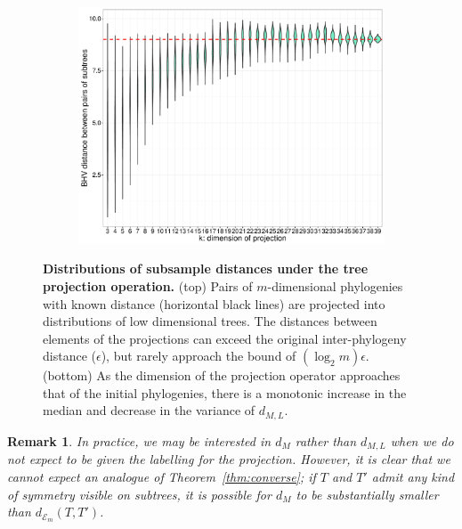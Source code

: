 \documentclass[a4paper,11pt]{article}
\newtheorem{remark}[theorem]{Remark}
\newcommand{\aE}{\mathcal{E}}
\begin{document}
\begin{figure}
    \begin{subfigure}{\linewidth}
    \centering
    \includegraphics[width=0.8\linewidth]{../figures/dimred_pwdist_m40_vs_K.pdf}
    \end{subfigure}

    \caption{{\bf Distributions of subsample distances under the tree projection operation.} (top) Pairs of $m$-dimensional phylogenies with known distance (horizontal black lines) are projected into distributions of low dimensional trees. The distances between elements of the projections can exceed the original inter-phylogeny distance ($\epsilon$), but rarely approach the bound of $(\log_2 m)\epsilon$. (bottom) As the dimension of the projection operator approaches that of the initial phylogenies, there is a monotonic increase in the median and decrease in the variance of $d_{M,L}$.}
    \label{fig:dimred_calibration}
\end{figure}

\begin{remark}
In practice, we may be interested in $d_M$ rather than $d_{M,L}$ when we do not expect to be given the labelling for the projection.
However, it is clear that we cannot expect an analogue of
Theorem~\ref{thm:converse}; if $T$ and $T'$ admit any kind of symmetry
visible on subtrees, it is possible for $d_M$ to be substantially
smaller than $d_{\aE_m}(T,T')$.
\end{remark}
\end{document}
